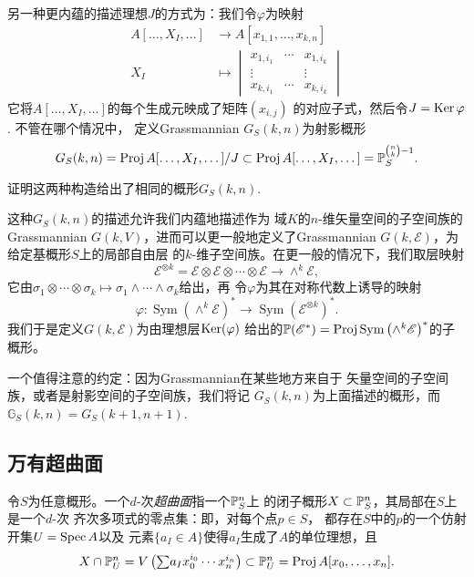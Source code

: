 
另一种更内蕴的描述理想$J$的方式为：我们令$\varphi$为映射
\begin{align*}
A[\dots,X_I,\dots]&\longrightarrow 
A[x_{1,1},\dots,x_{k,n}]\\
X_I &\longmapsto 
\begin{vmatrix}
x_{1,i_1}&\cdots & x_{1,i_k}\\
\vdots &&\vdots\\
x_{k,i_1}&\cdots & x_{k,i_k}
\end{vmatrix}
\end{align*}
它将$A[\dots,X_I,\dots]$的每个生成元映成了矩阵$(x_{i,j})$
的对应子式，然后令$J=\Ker \varphi$. 不管在哪个情况中，
定义Grassmannian $G_S(k,n)$为射影概形
\[
	G_S(k,n)=\proj A[\dots,X_I,\dots]/J
	\subset \proj A[\dots,X_I,\dots]=\P_S^{\binom nk -1}.
\]

\begin{exe}\label{exe:3.49}
证明这两种构造给出了相同的概形$G_S(k,n)$.
\end{exe}

这种$G_S(k,n)$的描述允许我们内蕴地描述作为
域$K$的$n$-维矢量空间的子空间族的Grassmannian
$G(k,V)$，进而可以更一般地定义了Grassmannian
$G(k,\mathscr E)$，为给定基概形$S$上的局部自由层
的$k$-维子空间族。在更一般的情况下，我们取层映射
\[
	\mathscr E^{\otimes k}=
	\mathscr E\otimes\mathscr E\otimes\cdots\otimes
	\mathscr E\longrightarrow \wedge^k\mathscr E,
\]
它由$\sigma_1\otimes \cdots\otimes \sigma_k\mapsto
\sigma_1\wedge \cdots\wedge \sigma_k$给出，再
令$\varphi$为其在对称代数上诱导的映射
\[
	\varphi:\operatorname{Sym}\left(\wedge^k 
	\mathscr E\right)^* \longrightarrow \operatorname{Sym}
	\left(\mathscr E^{\otimes k}\right)^*.
\]
我们于是定义$G(k,\mathscr E)$为由理想层$\Ker(\varphi)$
给出的$\P(\mathscr E^*)=\proj \operatorname{Sym}
\left(\wedge^k \mathscr E\right)^*$的子概形。

一个值得注意的约定：因为Grassmannian在某些地方来自于
矢量空间的子空间族，或者是射影空间的子空间族，我们将记
$G_S(k,n)$为上面描述的概形，而$\mathbb G_S(k,n)=
G_S(k+1,n+1)$.

\subsection{万有超曲面} \label{s:3.2.8}

\begin{defi}\label{defi:3.50}
令$S$为任意概形。一个$d$-次\textit{超曲面}指一个$\P_S^n$上
的闭子概形$X\subset \P_S^n$，其局部在$S$上是一个$d$-次
齐次多项式的零点集：即，对每个点$p\in S$，
都存在$S$中的$p$的一个仿射开集$U=\spec A$以及
元素$\{a_I\in A\}$使得$a_I$生成了$A$的单位理想，且
\[
	\textstyle{X\cap \P_U^n=V\left(
		{\sum}a_I x_0^{i_0}\cdots x_n^{i_n}
	\right)\subset \P_U^n=\proj A[x_0,\dots,x_n].}
\]
\end{defi}

